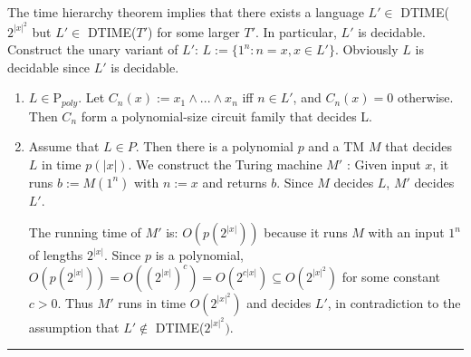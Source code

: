 \documentclass[twoside]{article}
\newenvironment{problem}[2][Problem]{\begin{trivlist}
		\item[\hskip \labelsep {\bfseries #1}\hskip \labelsep {\bfseries #2.}]}{\end{trivlist}}
\newenvironment{solution}{{\bf Solution:}}{\hfill\rule{2mm}{2mm}}
\begin{document}
\begin{problem}{6.3}
\end{problem}
\begin{solution}
	The time hierarchy theorem implies that there exists a language $L' \in $ DTIME($2^{|x|^2}$ but $L' \in$ DTIME($T'$) for some larger $T'$. In particular, $L'$	is decidable.
 Construct the unary variant of $L'$: $L := \{1^n: n = x, x \in L'\}$.
Obviously $L$ is decidable since $L'$ is decidable.
\begin{enumerate}
	\item $L \in $P$_{poly}$.  Let $C_n(x) := x_1 \wedge ... \wedge x_n$  iff $n \in L'$, and $C_n(x) = 0$ otherwise. Then $C_n$ form a polynomial-size circuit family that decides L.
	\item Assume that $L \in P$. Then there is a polynomial $p$ and a TM $M$ that decides $L$ in
	time $p(|x|)$. We construct the Turing machine $M'$	: Given input $x$, it runs $b := M(1^n)$
	with $n := x$ and returns $b$. Since $M$ decides $L$, $M'$ decides $L'$.
	
	The running time of $M'$ is: $O(p(2^{|x|}))$ because it runs $M$ with an input $1^n$ of lengths
	$2^{|x|}$. Since $p$ is a polynomial, $O(p(2^{|x|})) = O((2^{|x|})^c) = O(2^{c|x|})\subseteq  O(2^{|x|^2})$ for some 	constant $c > 0$. Thus $M'$ runs in time $O(2^{|x|^2})$ and decides $L'$, in contradiction to the assumption that $L'\notin$ DTIME($2^{|x|^2})$.
	
\end{enumerate}
\end{solution}

\begin{problem}{6.4}
\end{problem}
\end{document}
